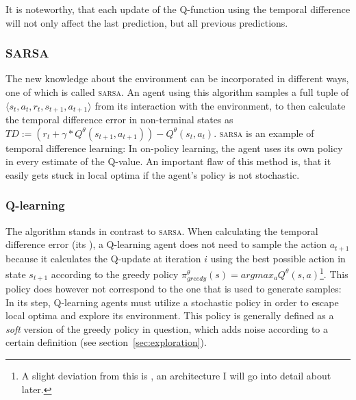 \noindent It is noteworthy, that each update of the Q-function using the temporal difference will not only affect the last prediction, but all previous predictions.



\subsubsection*{\textsc{SARSA}}
The new knowledge about the environment can be incorporated in different ways, one of which is called \textsc{sarsa}. An agent using this algorithm samples a full tuple of $\langle s_t, a_t, r_t, s_{t+1}, a_{t+1} \rangle$ from its interaction with the environment, to then calculate the temporal difference error in non-terminal states as $ TD := (r_t + \gamma * Q^\theta(s_{t+1}, a_{t+1})) - Q^\theta(s_t, a_t)  $. \textsc{sarsa} is an example of  temporal difference learning: In on-policy learning, the agent uses its own policy in every estimate of the Q-value. An important flaw of this method is, that it easily gets stuck in local optima if the agent's policy is not stochastic.

\subsubsection*{Q-learning}

\label{sec:qlearn}

The  algorithm \cite{watkins_learning_1989} stands in contrast to \textsc{sarsa}. When calculating the temporal difference error (its ), a Q-learning agent does not need to sample the action $a_{t+1}$ because it calculates the Q-update at iteration $i$ using the best possible action in state $s_{t+1}$ according to the greedy policy $\pi^\theta_{greedy}(s) = argmax_aQ^\theta(s,a)$\footnote{A slight deviation from this is , an architecture I will go into detail about later.}. This policy does however not correspond to the one that is used to generate samples: In its  step, Q-learning agents must utilize a stochastic policy in order to escape local optima and explore its environment. This policy is generally defined as a \textit{soft} version of the greedy policy in question, which adds noise according to a certain definition (see section~\ref{sec:exploration}). 

